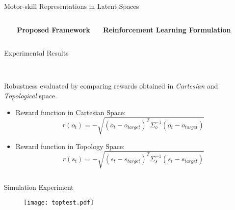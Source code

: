 \documentclass[final,hyperref={pdfpagelabels=false}]{beamer}
\begin{document}
\begin{frame}[t]
\begin{columns}[t]
\begin{column}{0.96\linewidth}
\begin{alertblock}{Motor-skill Representations in Latent Spaces}
\begin{columns}[t]
\begin{column}{0.24\linewidth}
        \end{column}

        \begin{column}{0.48\linewidth}
          \centering \textbf{Proposed Framework}

        \end{column}

        \begin{column}{0.24\linewidth}
          \centering \textbf{Reinforcement Learning Formulation}

        \end{column}
      \end{columns}
    \end{alertblock}
  \end{column}

  \begin{column}{0.02\linewidth}\end{column}
\end{columns}

\begin{alertblock}{Experimental Results}

\begin{columns}[t]

\begin{column}{0.49\linewidth}

\centering \textbf{}\\
\vspace{3mm}
\centering Robustness evaluated by comparing rewards obtained in \emph{Cartesian} and \emph{Topological} space.

\begin{itemize}
\item Reward function in Cartesian Space:
\begin{equation}
r(o_t) = - \sqrt{(o_t - o_{target})^T \Sigma_o^{-1} (o_t - o_{target})}
\end{equation}
\item Reward function in Topology Space:
\begin{equation}
r(s_t) = - \sqrt{(s_t - s_{target})^T \Sigma_s^{-1} (s_t - s_{target})}
\end{equation}
\end{itemize}

\begin{columns}[t]

\begin{column}{0.49\linewidth}

\centering Simulation Experiment
\begin{figure}
\centering
\texttt{[image: toptest.pdf]}
\end{figure}


\end{column}
\end{columns}
\end{column}
\end{columns}
\end{alertblock}
\end{frame}
\end{document}
